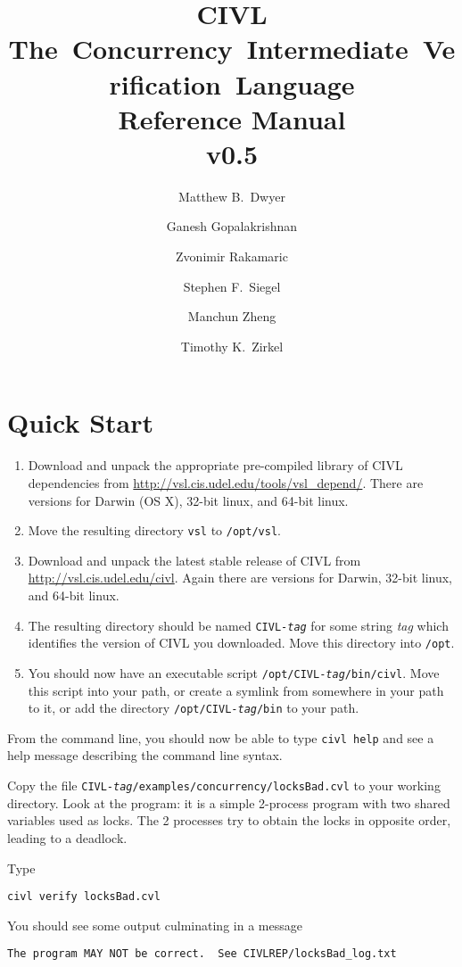 \documentclass[11pt, oneside, letterpaper]{book}
\title{{\huge\bf CIVL}\\\mbox{The Concurrency Intermediate Verification
  Language}\\Reference Manual\\ v0.5}
\author{%
  Matthew B.\ Dwyer \and
  Ganesh Gopalakrishnan \and
  Zvonimir Rakamaric \and
  Stephen F.\ Siegel \and
  Manchun Zheng \and
  Timothy K.\ Zirkel
}
\begin{document}
\maketitle
\tableofcontents

\chapter{Quick Start}

\begin{enumerate}
\item Download and unpack the appropriate pre-compiled library of CIVL
  dependencies from \url{http://vsl.cis.udel.edu/tools/vsl_depend/}.
  There are versions for Darwin (OS X), 32-bit linux, and 64-bit
  linux.
\item Move the resulting directory \texttt{vsl} to \texttt{/opt/vsl}.
\item Download and unpack the latest stable release of CIVL from 
  \url{http://vsl.cis.udel.edu/civl}.  Again there are versions
  for Darwin, 32-bit linux, and 64-bit linux.
\item The resulting directory should be named
  \texttt{CIVL-\textit{tag}} for some string \textit{tag} which
  identifies the version of CIVL you downloaded.  Move this directory
  into \texttt{/opt}.
\item You should now have an executable script
  \texttt{/opt/CIVL-\textit{tag}/bin/civl}.  Move this script into
  your path, or create a symlink from somewhere in your path to it, or
  add the directory \texttt{/opt/CIVL-\textit{tag}/bin} to your path.
\end{enumerate}

From the command line, you should now be able to type \texttt{civl
  help} and see a help message describing the command line syntax.

Copy the file
\texttt{CIVL-\textit{tag}/examples/concurrency/locksBad.cvl} to your
working directory.  Look at the program: it is a simple 2-process
program with two shared variables used as locks.  The 2 processes try
to obtain the locks in opposite order, leading to a deadlock.

Type
\begin{verbatim}
civl verify locksBad.cvl
\end{verbatim}
You should see some output culminating in a message 
\begin{verbatim}
The program MAY NOT be correct.  See CIVLREP/locksBad_log.txt
\end{verbatim}
\end{document}
